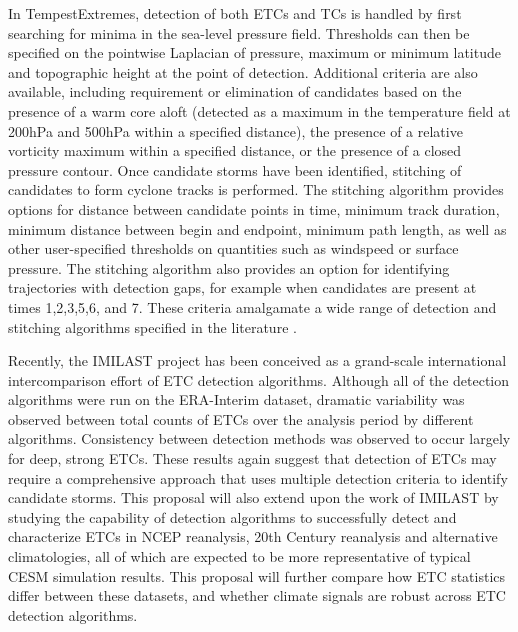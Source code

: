 \documentclass[11pt]{article}
\begin{document}
In TempestExtremes, detection of both ETCs and TCs is handled by first searching for minima in the sea-level pressure field.  Thresholds can then be specified on the pointwise Laplacian of pressure, maximum or minimum latitude and topographic height at the point of detection.  Additional criteria are also available, including requirement or elimination of candidates based on the presence of a warm core aloft (detected as a maximum in the temperature field at 200hPa and 500hPa within a specified distance), the presence of a relative vorticity maximum within a specified distance, or the presence of a closed pressure contour.  Once candidate storms have been identified, stitching of candidates to form cyclone tracks is performed.  The stitching algorithm provides options for distance between candidate points in time, minimum track duration, minimum distance between begin and endpoint, minimum path length, as well as other user-specified thresholds on quantities such as windspeed or surface pressure.  The stitching algorithm also provides an option for identifying trajectories with detection gaps, for example when candidates are present at times 1,2,3,5,6, and 7.  These criteria amalgamate a wide range of detection and stitching algorithms specified in the literature \citep{Oouchi2006,Bengtsson2007a,Knutson2007,Walsh2007,Zhao2009,Strachan2013,Tory2013a,Zarzycki2014AMIPTCs}.


Recently, the IMILAST project \citep{neu2013imilast} has been conceived as a grand-scale international intercomparison effort of ETC detection algorithms.  Although all of the detection algorithms were run on the ERA-Interim dataset, dramatic variability was observed between total counts of ETCs over the analysis period by different algorithms.  Consistency between detection methods was observed to occur largely for deep, strong ETCs.  These results again suggest that detection of ETCs may require a comprehensive approach that uses multiple detection criteria to identify candidate storms.  This proposal will also extend upon the work of IMILAST by studying the capability of detection algorithms to successfully detect and characterize ETCs in NCEP reanalysis, 20th Century reanalysis and alternative climatologies, all of which are expected to be more representative of typical CESM simulation results.  This proposal will further compare how ETC statistics differ between these datasets, and whether climate signals are robust across ETC detection algorithms.
\end{document}
